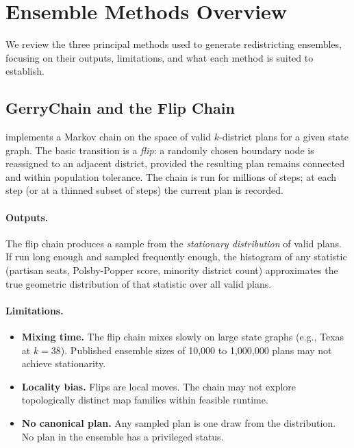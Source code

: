 \section{Ensemble Methods Overview}
\label{sec:ensemble-methods}

We review the three principal methods used to generate redistricting
ensembles, focusing on their outputs, limitations, and what each method
is suited to establish.

\subsection{GerryChain and the Flip Chain}

\gc{} \citep{gerrychain2021} implements a Markov chain on the space of
valid $k$-district plans for a given state graph.  The basic transition
is a \emph{flip}: a randomly chosen boundary node is reassigned to an
adjacent district, provided the resulting plan remains connected and within
population tolerance.  The chain is run for millions of steps; at each step
(or at a thinned subset of steps) the current plan is recorded.

\paragraph{Outputs.} The flip chain produces a sample from the
\emph{stationary distribution} of valid plans.  If run long enough and
sampled frequently enough, the histogram of any statistic (partisan seats,
Polsby-Popper score, minority district count) approximates the true
geometric distribution of that statistic over all valid plans.

\paragraph{Limitations.}
\begin{itemize}
  \item \textbf{Mixing time.} The flip chain mixes slowly on large state
    graphs (e.g., Texas at $k=38$).  Published ensemble sizes of 10,000
    to 1,000,000 plans may not achieve stationarity.
  \item \textbf{Locality bias.} Flips are local moves.  The chain may
    not explore topologically distinct map families within feasible runtime.
  \item \textbf{No canonical plan.} Any sampled plan is one draw from the
    distribution.  No plan in the ensemble has a privileged status.
\end{itemize}

